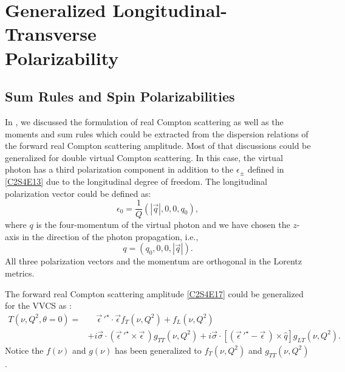 \section[Generalized Longitudinal-Transverse Polarizability]{Generalized Longitudinal-Transverse \\ Polarizability}
\label{C4S2}

\subsection{Sum Rules and Spin Polarizabilities}
\label{C4S2SS1}

In , we discussed the formulation of real Compton scattering as well as the moments and sum rules which could be extracted from the dispersion relations of the forward real Compton scattering amplitude. Most of that discussions could be generalized for double virtual Compton scattering. In this case, the virtual photon has a third polarization component in addition to the $\epsilon_\pm$ defined in \cref{C2S4E13} due to the longitudinal degree of freedom. The longitudinal polarization vector could be defined as:
\begin{equation} \label{C4S2E1}
\epsilon_0 = \frac{1}{Q}(|\vec{q}|,0,0,q_0),
\end{equation}
where $q$ is the four-momentum of the virtual photon and we have chosen the $z$-axis in the direction of the photon propagation, i.e.,
\begin{equation} \label{C4S2E2}
q = (q_0,0,0,|\vec{q}|).
\end{equation}
All three polarization vectors and the momentum are orthogonal in the Lorentz metrics.

The forward real Compton scattering amplitude \cref{C2S4E17} could be generalized for the VVCS as \cite{Drechsel2003}:
\begin{equation} \label{C4S2E3}
\begin{split}
T(\nu,Q^2,\theta=0) = & \quad \vec{\epsilon}\,'^\star\cdot\vec{\epsilon}f_T(\nu,Q^2)+f_L(\nu,Q^2) \\
& +i\vec{\sigma}\cdot(\vec{\epsilon}\,'^\star\times\vec{\epsilon}\,)g_{TT}(\nu,Q^2)+i\vec{\sigma}\cdot[(\vec{\epsilon}\,'^\star-\vec{\epsilon}\,)\times\hat{q}]g_{LT}(\nu,Q^2).
\end{split}
\end{equation}
Notice the $f(\nu)$ and $g(\nu)$ has been generalized to $f_T(\nu,Q^2)$ and $g_{TT}(\nu,Q^2)$.

